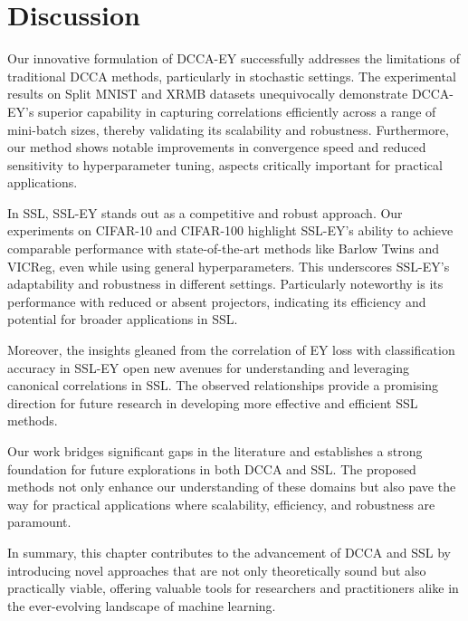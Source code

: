 \section{Discussion}

Our innovative formulation of DCCA-EY successfully addresses the limitations of traditional DCCA methods, particularly in stochastic settings. The experimental results on Split MNIST and XRMB datasets unequivocally demonstrate DCCA-EY's superior capability in capturing correlations efficiently across a range of mini-batch sizes, thereby validating its scalability and robustness. Furthermore, our method shows notable improvements in convergence speed and reduced sensitivity to hyperparameter tuning, aspects critically important for practical applications.

In SSL, SSL-EY stands out as a competitive and robust approach. Our experiments on CIFAR-10 and CIFAR-100 highlight SSL-EY's ability to achieve comparable performance with state-of-the-art methods like Barlow Twins and VICReg, even while using general hyperparameters. This underscores SSL-EY's adaptability and robustness in different settings. Particularly noteworthy is its performance with reduced or absent projectors, indicating its efficiency and potential for broader applications in SSL.

Moreover, the insights gleaned from the correlation of EY loss with classification accuracy in SSL-EY open new avenues for understanding and leveraging canonical correlations in SSL. The observed relationships provide a promising direction for future research in developing more effective and efficient SSL methods.

Our work bridges significant gaps in the literature and establishes a strong foundation for future explorations in both DCCA and SSL. The proposed methods not only enhance our understanding of these domains but also pave the way for practical applications where scalability, efficiency, and robustness are paramount.

In summary, this chapter contributes to the advancement of DCCA and SSL by introducing novel approaches that are not only theoretically sound but also practically viable, offering valuable tools for researchers and practitioners alike in the ever-evolving landscape of machine learning.